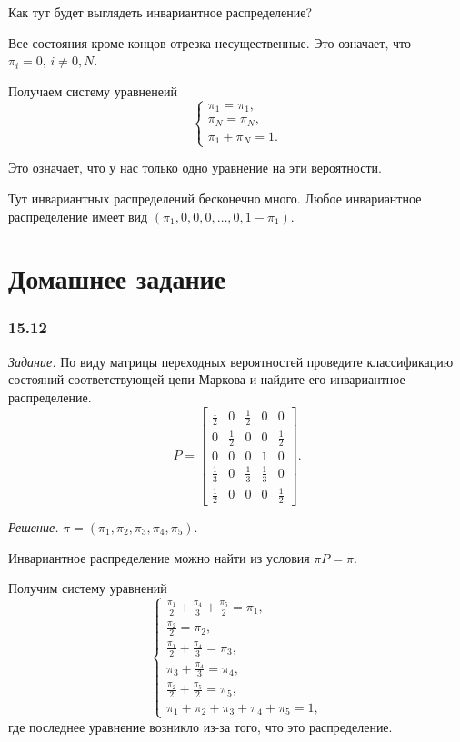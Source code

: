 Как тут будет выглядеть инвариантное распределение?

Все состояния кроме концов отрезка несущественные.
Это означает, что $ \pi_i = 0, \, i \neq 0, N$.

Получаем систему уравненеий
\begin{equation*}
  \begin{cases}
    \pi_1 = \pi_1, \\
    \pi_N = \pi_N, \\
    \pi_1 + \pi_N = 1.
  \end{cases}
\end{equation*}

Это означает, что у нас только одно уравнение на эти вероятности.

Тут инвариантных распределений бесконечно много.
Любое инвариантное распределение имеет вид $ \left( \pi_1, 0, 0, 0, \dotsc, 0, 1 - \pi_1 \right) $.

\section*{Домашнее задание}

\subsubsection*{15.12}

\textit{Задание.}
По виду матрицы переходных вероятностей проведите классификацию состояний соответствующей цепи
Маркова и найдите его инвариантное распределение.
\begin{equation*}
  P =
  \begin{bmatrix}
    \frac{1}{2} & 0 & \frac{1}{2} & 0 & 0 \\
    0 & \frac{1}{2} & 0 & 0 & \frac{1}{2} \\
    0 & 0 & 0 & 1 & 0 \\
    \frac{1}{3} & 0 & \frac{1}{3} & \frac{1}{3} & 0 \\
    \frac{1}{2} & 0 & 0 & 0 & \frac{1}{2}
  \end{bmatrix}.
\end{equation*}

\textit{Решение.}
$ \pi = \left( \pi_1, \pi_2, \pi_3, \pi_4, \pi_5 \right) $.

Инвариантное распределение можно найти из условия $ \pi P = \pi $.

Получим систему уравнений
\begin{equation*}
  \begin{cases}
    \frac{ \pi_1}{2} + \frac{ \pi_4}{3} + \frac{ \pi_5}{2} = \pi_1, \\
    \frac{ \pi_2}{2} = \pi_2, \\
    \frac{ \pi_1}{2} + \frac{ \pi_4}{3} = \pi_3, \\
    \pi_3 + \frac{ \pi_4}{3} = \pi_4, \\
    \frac{ \pi_2}{2} + \frac{ \pi_5}{2} = \pi_5, \\
    \pi_1 + \pi_2 + \pi_3 + \pi_4 + \pi_5 = 1,
  \end{cases}
\end{equation*}
где последнее уравнение возникло из-за того, что это распределение.

